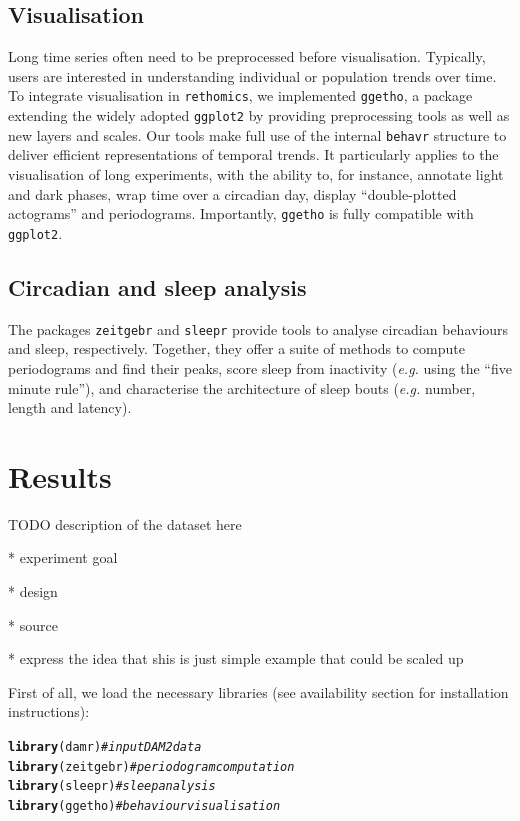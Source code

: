 \documentclass[10pt,letterpaper]{article}\usepackage[]{graphicx}\usepackage[]{color}
\makeatletter
\newcommand{\hlcom}[1]{\textcolor[rgb]{0.678,0.584,0.686}{\textit{#1}}}%
\newcommand{\hlstd}[1]{\textcolor[rgb]{0.345,0.345,0.345}{#1}}%
\newcommand{\hlkwd}[1]{\textcolor[rgb]{0.737,0.353,0.396}{\textbf{#1}}}%
\newenvironment{kframe}{%
 \def\at@end@of@kframe{}%
 \ifinner\ifhmode%
  \def\at@end@of@kframe{\end{minipage}}%
  \begin{minipage}{\columnwidth}%
 \fi\fi%
 \def\FrameCommand##1{\hskip\@totalleftmargin \hskip-\fboxsep
 \colorbox{shadecolor}{##1}\hskip-\fboxsep
     \hskip-\linewidth \hskip-\@totalleftmargin \hskip\columnwidth}%
 \MakeFramed {\advance\hsize-\width
   \@totalleftmargin\z@ \linewidth\hsize
   \@setminipage}}%
 {\par\unskip\endMakeFramed%
 \at@end@of@kframe}
\newenvironment{knitrout}{}{} %
\makeatother
\begin{document}
\subsection*{Visualisation}
Long time series often need to be preprocessed before visualisation.
Typically, users are interested in understanding individual or population trends over time.
To integrate visualisation in \texttt{rethomics},
we implemented \texttt{ggetho}, a package extending the widely adopted \texttt{ggplot2} by providing preprocessing tools as well as new layers and scales.
Our tools make full use of the internal \texttt{behavr} structure to deliver efficient representations of temporal trends.
It particularly applies to the visualisation of long experiments, with the ability to, for instance, annotate light and dark phases, wrap time over a circadian day, display ``double-plotted actograms'' and periodograms. 
Importantly, \texttt{ggetho} is fully compatible with \texttt{ggplot2}.

\subsection*{Circadian and sleep analysis}
The packages \texttt{zeitgebr} and \texttt{sleepr} provide tools to analyse circadian behaviours and sleep, respectively.
Together, they offer a suite of methods to compute periodograms and find their peaks, score sleep from inactivity (\emph{e.g.} using the ``five minute rule''), and characterise the architecture of sleep bouts (\emph{e.g.} number, length and latency).






\section*{Results}

TODO description of the dataset here

* experiment goal

* design

* source

* express the idea that shis is just simple example that could be scaled up



First of all, we load the necessary libraries (see availability section for installation instructions):
\begin{knitrout}
\color{fgcolor}\begin{kframe}
\begin{alltt}
\hlkwd{library}\hlstd{(damr)}      \hlcom{# input DAM2 data}
\hlkwd{library}\hlstd{(zeitgebr)}  \hlcom{# periodogram computation}
\hlkwd{library}\hlstd{(sleepr)}    \hlcom{# sleep analysis}
\hlkwd{library}\hlstd{(ggetho)}    \hlcom{# behaviour visualisation}
\end{alltt}
\end{kframe}
\end{knitrout}
\end{document}
